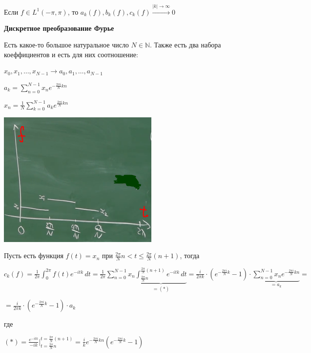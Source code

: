 \begin{consequence}
    Если $f \in L^1 (-\pi, \pi)$, то $a_k (f), b_k (f), c_k (f) \overset{|k| \to \infty}{\rightarrow} 0$
\end{consequence}

\begin{theorem}
    \textbf{Дискретное преобразование Фурье}

    Есть какое-то большое натуральное число $N \in \mathbb{N}$. Также есть два набора коеффициентов и есть для них соотношение:

    $x_0, x_1, \ldots, x_{N - 1} \rightarrow a_0, a_1, \ldots, a_{N - 1}$

    $a_k = \sum\limits_{n = 0}^{N - 1} x_n e^{-\frac{2\pi i}{N} kn}$

    $x_n = \frac{1}{N} \sum\limits_{k = 0}^{N - 1} a_k e^{\frac{2\pi i}{N} kn}$ 

    \begin{center}
        \includegraphics[width=8cm]{assets/05-fourierreihe/dft.png}
    \end{center}

    Пусть есть функция $f(t) = x_n$ при $\frac{2\pi}{N}n < t \leqslant \frac{2\pi}{N} (n + 1)$, тогда

    $c_k (f) = \frac{1}{2\pi} \int_0^{2\pi} f(t) e^{-itk}\, dt =
    \frac{1}{2\pi} \sum\limits_{n = 0}^{N - 1} x_n \underbrace{\int_{\frac{2\pi}{N} n}^{\frac{2\pi}{N} (n + 1)} e^{-itk} \, dt}_{=(*)} = 
    \frac{i}{2 \pi k} \cdot \left( e^{- \frac{2 \pi i}{N} k} - 1 \right) \cdot \underbrace{\sum\limits_{n=0}^{N - 1} x_n e^{- \frac{2 \pi i}{N} kn}}_{=a_k} =$
    
    $= \frac{i}{2 \pi k} \cdot \left( e^{- \frac{2 \pi i}{N} k} - 1 \right) \cdot a_k$ 
 

    где

    $(*) = \frac{e^{-itk}}{-ik} \bigg |_{t=\frac{2\pi}{N} n}^{t=\frac{2\pi}{N} (n + 1)} = \frac{i}{k} e^{- \frac{2\pi i}{N} kn} (e^{- \frac{2 \pi i}{N} k} - 1)$
\end{theorem}


